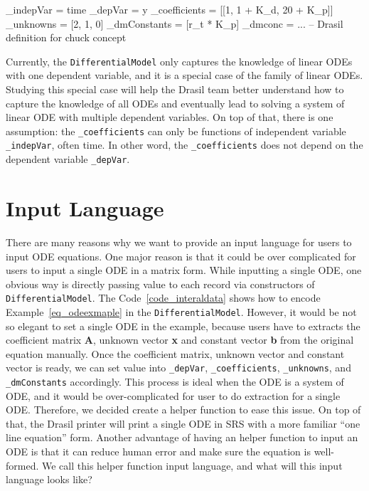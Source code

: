 \begin{listing}[ht]
\begin{haskell1}
_indepVar = time
_depVar = y
_coefficients = [[1, 1 + K_d, 20 + K_p]]
_unknowns = [2, 1, 0]
_dmConstants = [r_t * K_p]
_dmconc = ... -- Drasil definition for chuck concept
\end{haskell1}
\label{code_interaldata}
\end{listing}

Currently, the \verb|DifferentialModel| only captures the knowledge of linear ODEs with one dependent variable, and it is a special case of the family of linear ODEs. Studying this special case will help the Drasil team better understand how to capture the knowledge of all ODEs and eventually lead to solving a system of linear ODE with multiple dependent variables. On top of that, there is one assumption: the \verb|_coefficients| can only be functions of independent variable \verb|_indepVar|, often time. In other word, the \verb|_coefficients| does not depend on the dependent variable \verb|_depVar|.

\section{Input Language}
\label{sec_input}
There are many reasons why we want to provide an input language for users to input ODE equations. One major reason is that it could be over complicated for users to input a single ODE in a matrix form. While inputting a single ODE, one obvious way is directly passing value to each record via constructors of \verb|DifferentialModel|. The Code~\ref{code_interaldata} shows how to encode Example~\ref{eq_odeexmaple} in the \verb|DifferentialModel|. However, it would be not so elegant to set a single ODE in the example, because users have to extracts the coefficient matrix \textbf{A}, unknown vector \textbf{x} and constant vector \textbf{b} from the original equation manually. Once the coefficient matrix, unknown vector and constant vector is ready, we can set value into \verb|_depVar|, \verb|_coefficients|, \verb|_unknowns|, and \verb|_dmConstants| accordingly. This process is ideal when the ODE is a system of ODE, and it would be over-complicated for user to do extraction for a single ODE. Therefore, we decided create a helper function to ease this issue. On top of that, the Drasil printer will print a single ODE in SRS with a more familiar ``one line equation'' form. Another advantage of having an helper function to input an ODE is that it can reduce human error and make sure the equation is well-formed. We call this helper function input language, and what will this input language looks like? 

